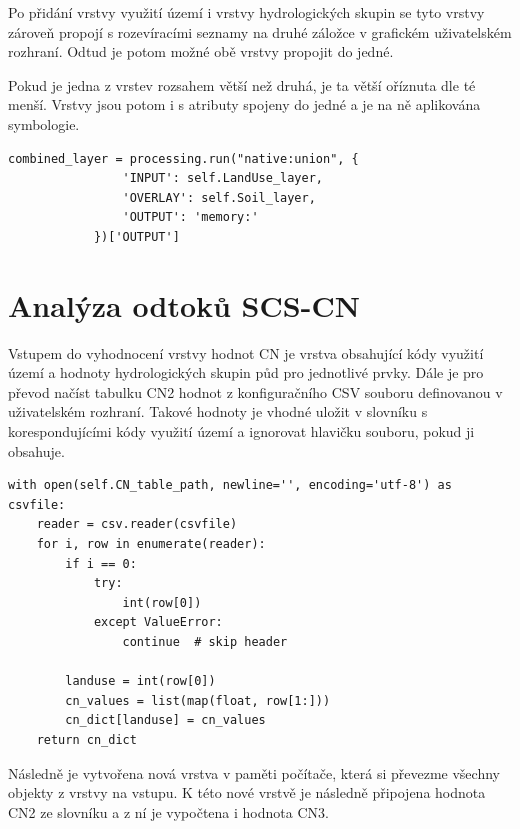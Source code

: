 \documentclass[a4paper,oneside,12pt]{book}
\begin{document}
\hspace{10mm}Po přidání vrstvy využití území i vrstvy hydrologických skupin se tyto vrstvy zároveň propojí s rozevíracími seznamy na druhé záložce v grafickém uživatelském rozhraní. Odtud je potom možné obě vrstvy propojit do jedné.

\hspace{10mm}Pokud je jedna z vrstev rozsahem větší než druhá, je ta větší oříznuta dle té menší. Vrstvy jsou potom i s atributy spojeny do jedné a je na ně aplikována symbologie.

\begin{lstlisting}[style=mypython, caption={Propojení vrstev využití území a HSP},label={kod:intersection}]
combined_layer = processing.run("native:union", {
                'INPUT': self.LandUse_layer,
                'OVERLAY': self.Soil_layer,
                'OUTPUT': 'memory:'
            })['OUTPUT']
\end{lstlisting}



\section{Analýza odtoků SCS-CN} \label{CN}
\hspace{10mm}Vstupem do vyhodnocení vrstvy hodnot CN je vrstva obsahující kódy využití území a hodnoty hydrologických skupin půd pro jednotlivé prvky. Dále je pro převod načíst tabulku CN2 hodnot z konfiguračního CSV souboru definovanou v uživatelském rozhraní. Takové hodnoty je vhodné uložit v slovníku s korespondujícími  kódy využití území a ignorovat hlavičku souboru, pokud ji obsahuje.  \newline

\begin{lstlisting}[style=mypython, caption={Vytvoření slovníku z CSV souboru},label={kod:cncsv}]
with open(self.CN_table_path, newline='', encoding='utf-8') as csvfile:
	reader = csv.reader(csvfile)
	for i, row in enumerate(reader):
		if i == 0:
			try:
				int(row[0])
			except ValueError:
				continue  # skip header

		landuse = int(row[0])
		cn_values = list(map(float, row[1:]))
		cn_dict[landuse] = cn_values
	return cn_dict
\end{lstlisting}
\hspace{10mm}Následně je vytvořena nová vrstva v paměti počítače, která si převezme všechny objekty z vrstvy na vstupu. K této nové vrstvě je následně připojena hodnota CN2 ze slovníku a z ní je vypočtena i hodnota CN3.
\end{document}
